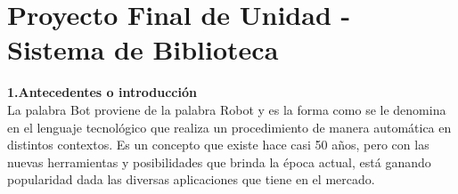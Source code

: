 \section{Proyecto Final de Unidad - Sistema de Biblioteca} 
\begin{flushleft}

\begin{itemize}
\textbf{1.Antecedentes o introducción}\\


La palabra Bot proviene de la palabra Robot y es la forma como se le denomina en el lenguaje tecnológico que realiza un procedimiento de manera automática en distintos contextos.
Es un concepto que existe hace casi 50 años, pero con las nuevas herramientas y posibilidades que brinda la época actual, está ganando popularidad dada las diversas aplicaciones que tiene en el mercado.\textbf{ }\\
\textbf{ }\\


\end{itemize}
\end{flushleft}

